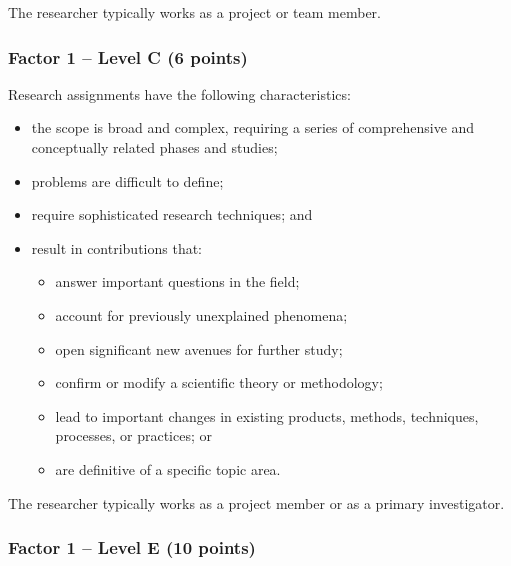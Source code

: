 \noindent The researcher typically works as a project or team member. 

\subsubsection*{Factor 1 --  Level C (6 points)}

Research assignments have the following characteristics:
\begin{itemize}
  \item the scope is broad and complex, requiring a series of comprehensive and conceptually related phases and studies; 
  \item problems are difficult to define;
  \item require sophisticated research techniques; and
  \item result in contributions that:
  \begin{itemize}
    \item answer important questions in the field;
    \item account for previously unexplained phenomena; 
    \item open significant new avenues for further study;
    \item confirm or modify a scientific theory or methodology;
    \item lead to important changes in existing products, methods, techniques, processes, or practices; or
    \item are definitive of a specific topic area. 
  \end{itemize}
\end{itemize}

\noindent The researcher typically works as a project member or as a primary investigator. 
\subsubsection*{Factor 1 --  Level E (10 points)}

